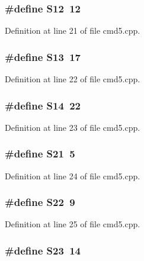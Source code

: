 \subsubsection[{S12}]{\setlength{\rightskip}{0pt plus 5cm}\#define S12~12}\label{cmd5_8cpp_a1ec499cd0e54ecc28c2ac2afea5b038e}


Definition at line 21 of file cmd5.\-cpp.

\subsubsection[{S13}]{\setlength{\rightskip}{0pt plus 5cm}\#define S13~17}\label{cmd5_8cpp_aaeec90429105fb54d853dd4fc7027a54}


Definition at line 22 of file cmd5.\-cpp.

\subsubsection[{S14}]{\setlength{\rightskip}{0pt plus 5cm}\#define S14~22}\label{cmd5_8cpp_a78342b0ccde2ed12fdf19a113cc266cf}


Definition at line 23 of file cmd5.\-cpp.

\subsubsection[{S21}]{\setlength{\rightskip}{0pt plus 5cm}\#define S21~5}\label{cmd5_8cpp_ab6d5354f647a0e7592a1f051fc8377b2}


Definition at line 24 of file cmd5.\-cpp.

\subsubsection[{S22}]{\setlength{\rightskip}{0pt plus 5cm}\#define S22~9}\label{cmd5_8cpp_addad30455da936bc1879ee9c72b46d59}


Definition at line 25 of file cmd5.\-cpp.

\subsubsection[{S23}]{\setlength{\rightskip}{0pt plus 5cm}\#define S23~14}\label{cmd5_8cpp_a6321a8b29628936f76e9e78cf5bda95f}


